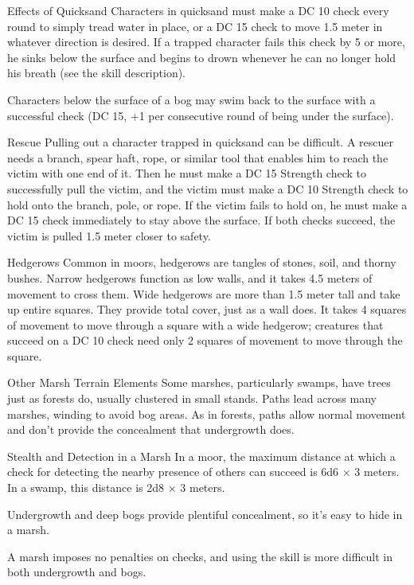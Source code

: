 Effects of Quicksand
Characters in quicksand must make a DC 10  check every round to simply tread water in place, or a DC 15  check to move 1.5 meter in whatever direction is desired. If a trapped character fails this check by 5 or more, he sinks below the surface and begins to drown whenever he can no longer hold his breath (see the  skill description).

Characters below the surface of a bog may swim back to the surface with a successful  check (DC 15, +1 per consecutive round of being under the surface).

Rescue
Pulling out a character trapped in quicksand can be difficult. A rescuer needs a branch, spear haft, rope, or similar tool that enables him to reach the victim with one end of it. Then he must make a DC 15 Strength check to successfully pull the victim, and the victim must make a DC 10 Strength check to hold onto the branch, pole, or rope. If the victim fails to hold on, he must make a DC 15  check immediately to stay above the surface. If both checks succeed, the victim is pulled 1.5 meter closer to safety.

Hedgerows
Common in moors, hedgerows are tangles of stones, soil, and thorny bushes. Narrow hedgerows function as low walls, and it takes 4.5 meters of movement to cross them. Wide hedgerows are more than 1.5 meter tall and take up entire squares. They provide total cover, just as a wall does. It takes 4 squares of movement to move through a square with a wide hedgerow; creatures that succeed on a DC 10  check need only 2 squares of movement to move through the square.

Other Marsh Terrain Elements
Some marshes, particularly swamps, have trees just as forests do, usually clustered in small stands. Paths lead across many marshes, winding to avoid bog areas. As in forests, paths allow normal movement and don't provide the concealment that undergrowth does.

Stealth and Detection in a Marsh
In a moor, the maximum distance at which a  check for detecting the nearby presence of others can succeed is 6d6 $\times$ 3 meters. In a swamp, this distance is 2d8 $\times$ 3 meters.

Undergrowth and deep bogs provide plentiful concealment, so it's easy to hide in a marsh.

A marsh imposes no penalties on  checks, and using the  skill is more difficult in both undergrowth and bogs.